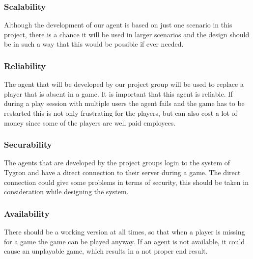 \subsubsection*{Scalability}
Although the development of our agent is based on just one scenario in this project, there is a chance it will be used in larger scenarios and the design should be in such a way that this would be possible if ever needed.

\subsubsection*{Reliability}
The agent that will be developed by our project group will be used to replace a player that is absent in a game. It is important that this agent is reliable. If during a play session with multiple users the agent fails and the game has to be restarted this is not only frustrating for the players, but can also cost a lot of money since some of the players are well paid employees.

\subsubsection*{Securability}
The agents that are developed by the project groups login to the system of Tygron and have a direct connection to their server during a game. The direct connection could give some problems in terms of security, this should be taken in consideration while designing the system.

\subsubsection*{Availability}
There should be a working version at all times, so that when a player is missing for a game the game can be played anyway. If an agent is not available, it could cause an unplayable game, which results in a not proper end result.
